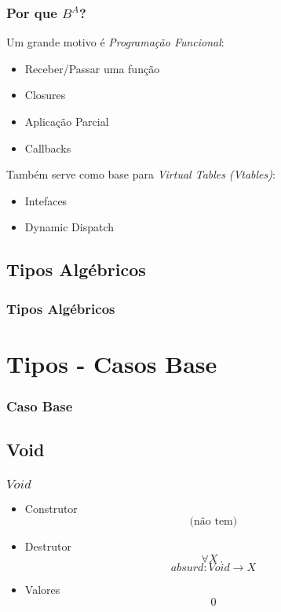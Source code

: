 \documentclass{beamer}
\renewcommand{\d}{\:.\:}
\begin{document}
\begin{frame}
    \frametitle{Por que \(B^A\)?}
    Um grande motivo é \emph{Programação Funcional}:
    \begin{itemize}
        \item Receber/Passar uma função
        \item Closures
        \item Aplicação Parcial
        \item Callbacks
    \end{itemize}
    \vfill
    \pause
    Também serve como base para
    \emph{Virtual Tables} \emph{(Vtables)}:
    \begin{itemize}
        \item Intefaces
        \item Dynamic Dispatch
    \end{itemize}
\end{frame}

\subsection{Tipos Algébricos}
\begin{frame}
    \frametitle{Tipos Algébricos}
\end{frame}

\section{Tipos - Casos Base}
\begin{frame}
    \frametitle{Caso Base}
\end{frame}

\subsection{Void}
\begin{frame}
    \frametitle{\(Void\)}
    \pause
    \begin{itemize}
        \item Construtor
            \[
                \text{(não tem)}
            \]
            \vfill
        \item Destrutor
            \[
                \forall X \d
            \] \[
                absurd : Void \to X
            \]
            \vfill
        \item Valores
            \[
                0
            \]
    \end{itemize}
\end{frame}
\end{document}
